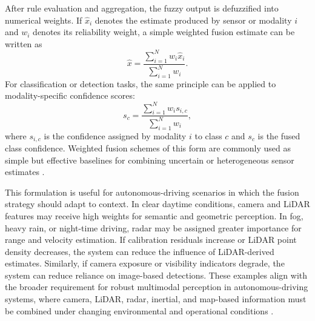 \documentclass{ieeeaccess}
\begin{document}
After rule evaluation and aggregation, the fuzzy output is defuzzified into numerical weights. If $\hat{x}_i$ denotes the estimate produced by sensor or modality $i$ and $w_i$ denotes its reliability weight, a simple weighted fusion estimate can be written as
\begin{equation}
    \hat{x} =
    \frac{\sum_{i=1}^{N} w_i \hat{x}_i}
    {\sum_{i=1}^{N} w_i}.
\end{equation}
For classification or detection tasks, the same principle can be applied to modality-specific confidence scores:
\begin{equation}
    s_c =
    \frac{\sum_{i=1}^{N} w_i s_{i,c}}
    {\sum_{i=1}^{N} w_i},
\end{equation}
where $s_{i,c}$ is the confidence assigned by modality $i$ to class $c$ and $s_c$ is the fused class confidence. Weighted fusion schemes of this form are commonly used as simple but effective baselines for combining uncertain or heterogeneous sensor estimates \cite{hall_introduction_1997, khaleghi_multisensor_2013}.

This formulation is useful for autonomous-driving scenarios in which the fusion strategy should adapt to context. In clear daytime conditions, camera and LiDAR features may receive high weights for semantic and geometric perception. In fog, heavy rain, or night-time driving, radar may be assigned greater importance for range and velocity estimation. If calibration residuals increase or LiDAR point density decreases, the system can reduce the influence of LiDAR-derived estimates. Similarly, if camera exposure or visibility indicators degrade, the system can reduce reliance on image-based detections. These examples align with the broader requirement for robust multimodal perception in autonomous-driving systems, where camera, LiDAR, radar, inertial, and map-based information must be combined under changing environmental and operational conditions \cite{khaleghi_multisensor_2013, baltrusaitis_multimodal_2019}.
\end{document}
